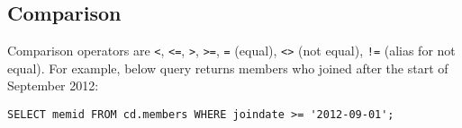 \subsection{Comparison}
\label{subsection_comparison}%
Comparison operators are \texttt{<}, \texttt{<=}, \texttt{>}, \texttt{>=}, \texttt{=} (equal), \texttt{<>} (not equal), \texttt{!=} (alias for not equal).
For example, below query returns members who joined after the start of September 2012:
\begin{verbatim}
SELECT memid FROM cd.members WHERE joindate >= '2012-09-01';
\end{verbatim}
